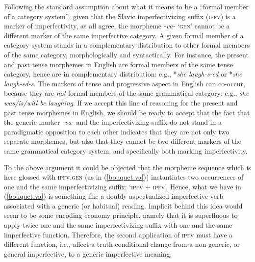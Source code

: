 \documentclass[output=paper,colorlinks,citecolor=brown]{langscibook}
\begin{document}
Following the standard assumption about what it means to be a ``formal member of a category system'', given that the Slavic imperfectivizing suffix (\textsc{ipfv}) is a marker of imperfectivity, as all agree,
the  morpheme \textit{-va-} `\textsc{gen}' cannot be a different marker of the same imperfective category.
A given formal member of a category system stands in a complementary distribution to other formal members of the same category, morphologically and syntactically. For instance, the present and past tense morphemes in English are formal members of the same tense category, hence are in complementary distribution: e.g., *\textit{she laugh-s-ed} or *\textit{she laugh-ed-s}. The markers of tense and progressive aspect in English can co-occur, because they are \textit{not} formal members of the same grammatical category: e.g., \textit{she was/is/will be laughing}.
If we accept this line of reasoning for the present and past tense morphemes in English, we should be ready to accept that
the fact that the generic marker \textit{-va-} and the imperfectivizing suffix do not stand in a paradigmatic opposition to each other indicates that they are not only two separate morphemes, but also that they cannot be two different markers of the same grammatical category system, and specifically both marking imperfectivity.

To the above argument it could be objected that
the morpheme sequence which is here glossed with \textsc{ipfv.gen} (as in (\ref{bouquet.va})) instantiates two occurrences
of one and the same imperfectivizing suffix: `\textsc{ipfv} + \textsc{ipfv}'. Hence, what we have
in (\ref{bouquet.va}) is something like a doubly aspectualized imperfective verb associated with a generic (or habitual) reading.
Implicit behind this idea would seem to be
some encoding  economy principle, namely that it is
superfluous to apply twice one and the same imperfectivizing suffix with one and the same imperfective function. Therefore, the second application of \textsc{ipfv} must
have a different function, i.e., affect a truth-conditional change from a non-generic, or general imperfective, to a generic imperfective meaning.
\end{document}

